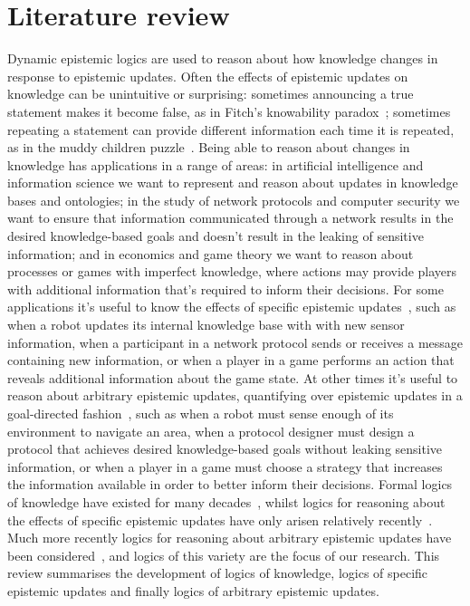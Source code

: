 \chapter{Literature review}\label{literature}

Dynamic epistemic logics are used to reason about how knowledge changes in response to epistemic updates.
Often the effects of epistemic updates on knowledge can be unintuitive or surprising: sometimes announcing a true statement makes it become false, as in Fitch's knowability paradox~\cite{fitch:1963}; sometimes repeating a statement can provide different information each time it is repeated, as in the muddy children puzzle~\cite{barwise:1981, vanditmarsch:2007}. 
Being able to reason about changes in knowledge has applications in a range of areas:
in artificial intelligence and information science we want to represent and reason about updates in knowledge bases and ontologies;
in the study of network protocols and computer security we want to ensure that information communicated through a network results in the desired knowledge-based goals and doesn't result in the leaking of sensitive information; and
in economics and game theory we want to reason about processes or games with imperfect knowledge, where actions may provide players with additional information that's required to inform their decisions.
For some applications it's useful to know the effects of specific epistemic updates~\cite{plaza:1989,baltag:1998}, such as when a robot updates its internal knowledge base with with new sensor information, when a participant in a network protocol sends or receives a message containing new information, or when a player in a game performs an action that reveals additional information about the game state.
At other times it's useful to reason about arbitrary epistemic updates, quantifying over epistemic updates in a goal-directed fashion~\cite{balbiani:2007,agotnes:2010,vanditmarsch:2009}, such as when a robot must sense enough of its environment to navigate an area, when a protocol designer must design a protocol that achieves desired knowledge-based goals without leaking sensitive information, or when a player in a game must choose a strategy that increases the information available in order to better inform their decisions.
Formal logics of knowledge have existed for many decades~\cite{vonwright:1951,hintikka:1957,hintikka:1961,hintikka:1962}, whilst logics for reasoning about the effects of specific epistemic updates have only arisen relatively recently~\cite{plaza:1989,gerbrandy:1997,baltag:1998}. 
Much more recently logics for reasoning about arbitrary epistemic updates have been considered~\cite{balbiani:2007,vanditmarsch:2009,agotnes:2010}, and logics of this variety are the focus of our research.
This review summarises the development of logics of knowledge, logics of specific epistemic updates and finally logics of arbitrary epistemic updates.  

